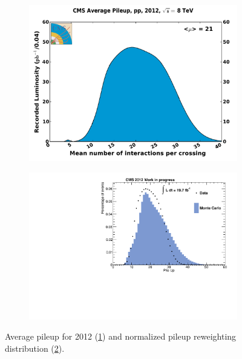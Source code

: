 \begin{figure}[htb!]
  \centering
  \begin{subfigure}[b]{0.495\textwidth}
    \centering
    \includegraphics[width=\textwidth]{plots/pileup_pp_2012.pdf}
    \caption{\label{fig:pileup2012}}
  \end{subfigure}
  \begin{subfigure}[b]{0.495\textwidth}
    \centering
    \includegraphics[width=\textwidth]{plots/pileup.pdf}
    \caption{\label{fig:pileup}}
  \end{subfigure}
  \caption{Average pileup for 2012 (\ref{fig:pileup2012}) and normalized pileup reweighting distribution (\ref{fig:pileup}).}
  \label{fig:pileups}
\end{figure}

